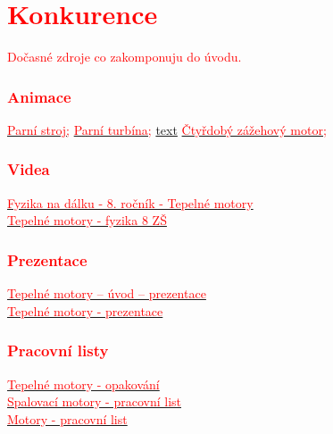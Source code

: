 \section*{\textcolor{red}{Konkurence}}
\textcolor{red}{Dočasné zdroje co zakomponuju do úvodu.}
\subsubsection*{\textcolor{red}{Animace}}
\href{https://en.wikipedia.org/wiki/Steam_engine#/media/File:Steam_engine_in_action.gif}{\textcolor{red}{Parní stroj;}}
\href{https://www.tlv.com/sites/default/files/tlv_assets/ja/steam_story/images/0611syuruitoyouto/pafs-generator-turbine_EN.gif}{\textcolor{red}{Parní turbína;}}
\href{URL}{text}
\href{https://en.wikipedia.org/wiki/Internal_combustion_engine#/media/File:4StrokeEngine_Ortho_3D_Small.gif}{\textcolor{red}{Čtyřdobý zážehový motor;}}
\subsubsection*{\textcolor{red}{Videa}}
\href{https://www.youtube.com/watch?v=dR1pyp3q9Ko}{\textcolor{red}{Fyzika na dálku - 8. ročník - Tepelné motory}}\\
\href{https://www.youtube.com/watch?v=k9DhdvbmRiw}{\textcolor{red}{Tepelné motory - fyzika 8 ZŠ}}
\subsubsection*{\textcolor{red}{Prezentace}}
\href{https://zs-nucice.cz/UserFiles/File/eu_new_361-400/VY_32_INOVACE_374.pdf}{\textcolor{red}{Tepelné motory -- úvod -- prezentace}}\\
\href{https://view.officeapps.live.com/op/view.aspx?src=http://dumy.cz/nahled/73077}{\textcolor{red}{Tepelné motory - prezentace}}
\subsubsection*{\textcolor{red}{Pracovní listy}}
\href{https://www.google.com/url?sa=i&url=https\%3A\%2F\%2Fslideplayer.cz\%2Fslide\%2F12677857\%2F&psig=AOvVaw0fGM8NbBvM9WlZNO6TqO0o&ust=1741690312947000&source=images&cd=vfe&opi=89978449&ved=0CAMQjB1qFwoTCMCD2Zes_4sDFQAAAAAdAAAAABBP}{\textcolor{red}{Tepelné motory - opakování}}\\
\href{https://view.officeapps.live.com/op/view.aspx?src=http://dumy.cz/nahled/117673}{\textcolor{red}{Spalovací motory - pracovní list}}\\
\href{https://www.soshlinky.cz/documents/uploads/71\%20Motory.xlsx}{\textcolor{red}{Motory - pracovní list}}